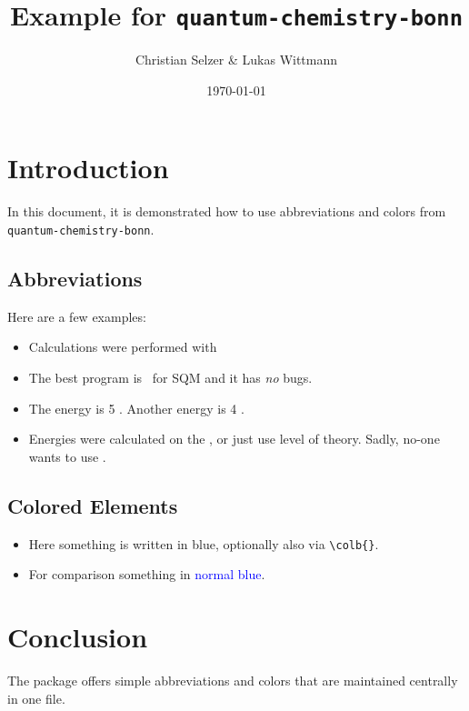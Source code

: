 \documentclass[a4paper,12pt]{article}
\title{Example for \texttt{quantum-chemistry-bonn}}
\author{Christian Selzer \& Lukas Wittmann}
\date{\today}
\begin{document}
\maketitle

\section{Introduction}

    In this document, it is demonstrated how to use abbreviations and colors from \texttt{quantum-chemistry-bonn}.

\subsection{Abbreviations}
    Here are a few examples:
    \begin{itemize}
      \item Calculations were performed with \orca\
      \item The best program is \xtb\ for SQM and it has \emph{no} bugs.
      \item The energy is 5 \kcalpmol. Another energy is 4 \kjpmol.
      \item Energies were calculated on the \method{r2scan3c}, or just use  level of theory. Sadly, no-one wants to use .
    \end{itemize}

\subsection{Colored Elements}
    \begin{itemize}
        \item Here something is written in \textcolor{bonnblue}{blue}, optionally also via \verb|\colb{}|.
        \item For comparison something in \textcolor{blue}{normal blue}.
    \end{itemize}


\section{Conclusion}
    The package offers simple abbreviations and colors that are maintained centrally in one file.
\end{document}
